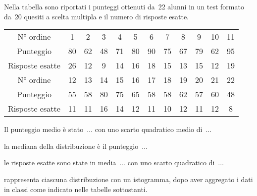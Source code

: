 \begin{esercizio}
\label{ese:A.45}
Nella tabella sono riportati i punteggi ottenuti da~22 alunni in un test 
formato da~20 quesiti a scelta multipla e il numero di risposte esatte.
\begin{center}
\begin{tabular}{cccccccccccc}
\toprule
N° ordine & 1 & 2 & 3 & 4 & 5 & 6 & 7 & 8 & 9 & 10 & 11 \\
Punteggio & 80 & 62 & 48 & 71 & 80 & 90 & 75 & 67 & 79 & 62 & 95 \\
Risposte esatte & 26 & 12 & 9 & 14 & 16 & 18 & 15 & 13 & 15 & 12 & 19 \\
\midrule
N° ordine & 12 & 13 & 14 & 15 & 16 & 17 & 18 & 19 & 20 & 21 & 22 \\
Punteggio & 55 & 58 & 80 & 75 & 65 & 58 & 58 & 62 & 57 & 60 & 48 \\
Risposte esatte & 11 & 11 & 16 & 14 & 12 & 11 & 10 & 12 & 11 & 12 & 8 \\
\bottomrule
\end{tabular}
\end{center}
\begin{enumeratea}
 \item Il punteggio medio è stato~$\dots$ con uno scarto quadratico medio 
di~$\dots$
 \item la mediana della distribuzione è il punteggio~$\dots$
 \item le risposte esatte sono state in media~$\dots$ con uno scarto 
quadratico di~$\dots$
 \item rappresenta ciascuna distribuzione con un istogramma, dopo aver 
aggregato i dati in classi come indicato nelle tabelle sottostanti.
\end{enumeratea}


\end{esercizio}
